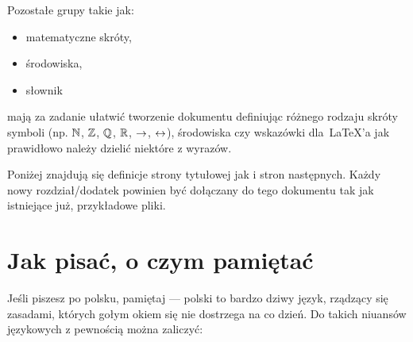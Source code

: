 Pozostałe grupy takie jak:

\begin{itemize}
	\item matematyczne skróty,
	\item środowiska,
	\item słownik
\end{itemize}
mają za zadanie ułatwić tworzenie dokumentu definiując różnego rodzaju skróty symboli (np. $\mathbb{N}$, $\mathbb{Z}$, $\mathbb{Q}$, $\mathbb{R}$, $\rightarrow$, $\leftrightarrow$), środowiska czy wskazówki dla~\LaTeX'a jak prawidłowo należy dzielić niektóre z wyrazów.

Poniżej znajdują się definicje strony tytułowej jak i stron następnych.
Każdy nowy rozdział/dodatek powinien być dołączany do tego dokumentu tak jak istniejące już, przykładowe pliki.

\section{Jak pisać, o czym pamiętać}

Jeśli piszesz po polsku, pamiętaj --- polski to bardzo dziwy język, rządzący się zasadami, których gołym okiem się nie dostrzega na co dzień.
Do takich niuansów językowych z pewnością można zaliczyć:

